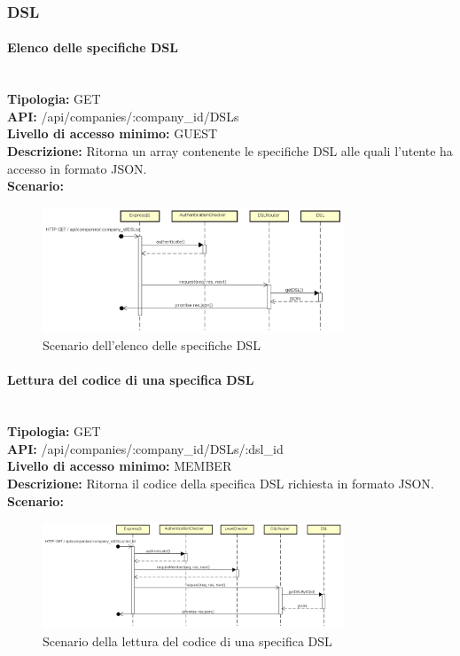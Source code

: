 \newpage
\subsubsection{DSL}
\paragraph{Elenco delle specifiche DSL}\mbox{}\\
\textbf{Tipologia:} GET \\
\textbf{API:} /api/companies/:company\_id/DSLs \\
\textbf{Livello di accesso minimo:} GUEST \\
\textbf{Descrizione:} Ritorna un array contenente le specifiche DSL alle quali l'utente ha accesso in formato JSON. \\
\textbf{Scenario:} 
\begin{figure}[H]
\centering
\includegraphics[width=0.8\textwidth]{res/sections/backend/sequence/(GET)dsl.png}
\caption{Scenario dell'elenco delle specifiche DSL}
\end{figure}

\newpage
\paragraph{Lettura del codice di una specifica DSL}\mbox{}\\
\textbf{Tipologia:} GET \\
\textbf{API:} /api/companies/:company\_id/DSLs/:dsl\_id \\
\textbf{Livello di accesso minimo:} MEMBER \\
\textbf{Descrizione:} Ritorna il codice della specifica DSL richiesta in formato JSON. \\
\textbf{Scenario:} 
\begin{figure}[H]
\centering
\includegraphics[width=0.8\textwidth]{res/sections/backend/sequence/(GET)dslByID.png}
\caption{Scenario della lettura del codice di una specifica DSL}
\end{figure}

